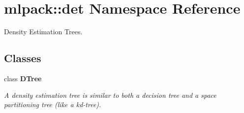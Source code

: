 \section{mlpack\+:\+:det Namespace Reference}
\label{namespacemlpack_1_1det}


Density Estimation Trees.  


\subsection*{Classes}
\begin{DoxyCompactItemize}
\item 
class {\bf D\+Tree}
\begin{DoxyCompactList}\small\item\em A density estimation tree is similar to both a decision tree and a space partitioning tree (like a kd-\/tree). \end{DoxyCompactList}\end{DoxyCompactItemize}
